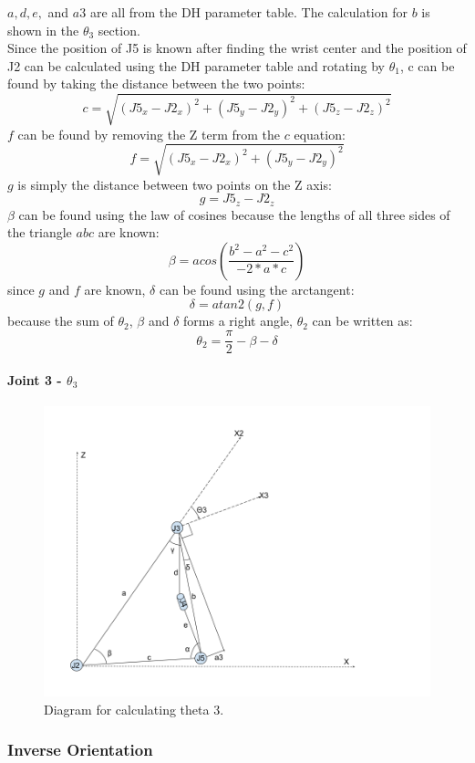 \documentclass{article}
\begin{document}
$a, d, e,$ and $a3$ are all from the DH parameter table.
The calculation for $b$ is shown in the $\theta _3$ section. \\
Since the position of J5 is known after finding the wrist center and the position of J2 can be calculated using the DH parameter table and rotating by $\theta _1$, c can be found by taking the distance between the two points:
\[c = \sqrt{(J5_x - J2_x)^2 + (J5_y - J2_y)^2 + (J5_z - J2_z)^2}\]
$f$ can be found by removing the Z term from the $c$ equation:
\[f = \sqrt{(J5_x - J2_x)^2 + (J5_y - J2_y)^2}\]
$g$ is simply the distance between two points on the Z axis:
\[g = J5_z - J2_z\]
$\beta$ can be found using the law of cosines because the lengths of all three sides of the triangle $abc$ are known:
\[\beta = acos(\frac{b^2 - a^2 - c^2}{-2 * a * c})\]
since $g$ and $f$ are known, $\delta$ can be found using the arctangent:
\[\delta = atan2(g,f)\]
because the sum of $\theta _2$, $\beta$ and $\delta$ forms a right angle, $\theta _2$ can be written as:
\[\theta _2 = \frac{\pi}{2} - \beta - \delta\]

\paragraph{Joint 3 - $\theta _3$}
\begin{figure}[H]
    \includegraphics[width=\linewidth]{theta3.png}
    \caption{Diagram for calculating theta 3.}
    \label{fig:theta3}
\end{figure}

\subsubsection{Inverse Orientation}
\end{document}

